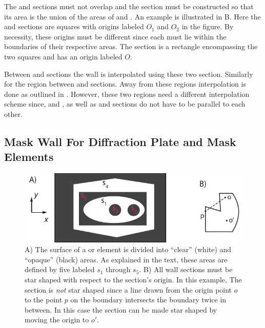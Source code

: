 The  and  sections must not overlap and the  section must be
constructed so that its area is the union of the areas of  and . An example is
illustrated in B. Here the  and  sections are squares with
origins labeled $O_1$ and $O_2$ in the figure. By necessity, these origins must be different since
each must lie within the boundaries of their respective areas. The  section is a rectangle
encompassing the two squares and has an origin labeled $O$.

Between  and  sections the wall is interpolated using these two
section. Similarly for the region between  and  sections. Away from these
regions interpolation is done as outlined in . However, these two regions
need a different interpolation scheme since,  and , as well as  and
 sections do not have to be parallel to each other.

\subsection{Mask Wall For Diffraction Plate and Mask Elements}
\label{s:masking.wall}

\begin{figure}[tb]
  \centering
  \includegraphics[width=6in]{diffraction-plate.pdf}
  \caption[Example mask wall]{
A) The surface of a  or  element is divided into ``clear'' (white)
and ``opaque'' (black) areas. As explained in the text, these areas are defined by five
 labeled $s_1$ through $s_5$. B) All wall sections must be star shaped with respect to
the section's origin. In this example, The section is {\em not} star shaped since a line drawn from
the origin point $o$ to the point $p$ on the boundary intersects the boundary twice in between. In
this case the section can be made star shaped by moving the origin to $o'$.
  }
  \label{f:diff.plate}
\end{figure}

